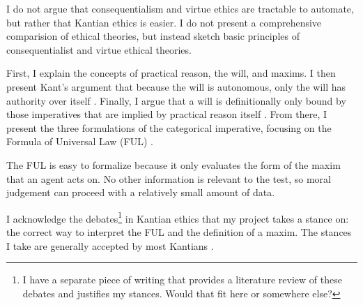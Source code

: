\begin{isabellebody}
\begin{isamarkuptext}
I do not argue that consequentialism and virtue ethics are tractable to automate, but 
rather that Kantian ethics is easier. I do not present a comprehensive comparision
of ethical theories, but instead sketch basic principles of consequentialist and virtue 
ethical theories.%
\end{isamarkuptext}\isamarkuptrue%
%
\isadelimdocument
%
\endisadelimdocument
%
\isatagdocument
%
\isamarkuptrue%
%
\isamarkuptrue%
%
\endisatagdocument
{\isafolddocument}%
%
\isadelimdocument
%
\endisadelimdocument
%
\begin{isamarkuptext}%
First, I explain the concepts of 
practical reason, the will, and maxims. I then present Kant's argument that because the will is autonomous,
only the will has authority over itself \cite{sources}. Finally, I argue that a will is definitionally only 
bound by those imperatives that are implied by practical reason itself \cite{velleman}. From there, I present 
the three formulations of the categorical imperative, focusing on the Formula of Universal Law (FUL) \cite{groundwork}.%
\end{isamarkuptext}\isamarkuptrue%
%
\isadelimdocument
%
\endisadelimdocument
%
\isatagdocument
%
\isamarkuptrue%
%
\endisatagdocument
{\isafolddocument}%
%
\isadelimdocument
%
\endisadelimdocument
%
\begin{isamarkuptext}%
The FUL is easy to formalize because it only evaluates the 
form of the maxim that an agent acts on. No other information is relevant to the test, so moral 
judgement can proceed with a relatively small amount of data.%
\end{isamarkuptext}\isamarkuptrue%
%
\isadelimdocument
%
\endisadelimdocument
%
\isatagdocument
%
\isamarkuptrue%
%
\endisatagdocument
{\isafolddocument}%
%
\isadelimdocument
%
\endisadelimdocument
%
\begin{isamarkuptext}%
I acknowledge the debates\footnote{I have a separate piece of writing that provides a literature 
review of these debates and justifies my stances. Would that fit here or somewhere else?} in Kantian 
ethics that my project takes a stance on: the correct way to interpret the FUL and the definition of a 
maxim. The stances I take are generally accepted by most Kantians \cite{ebelsduggan, KorsgaardFUL}.%
\end{isamarkuptext}\isamarkuptrue%
%
\isadelimdocument
%
\endisadelimdocument
%

\end{isabellebody}
